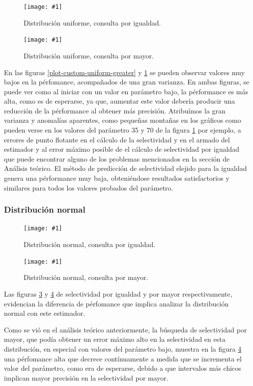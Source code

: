 \documentclass[a4paper, 10pt, twoside]{article}
\newcommand{\grafico}[3]{
  \begin{figure}[H]
    \texttt{[image: \#1]}
    \caption{#2}
    \label{#3}
  \end{figure}
}
\begin{document}
\grafico{plot-hist-uniform-equal}
        {Distribución uniforme, consulta por igualdad.}
        {plot-hist-uniform-equal}
\grafico{plot-hist-uniform-greater}
        {Distribución uniforme, consulta por mayor.}
        {plot-hist-uniform-greater}

En las figuras \ref{plot-custom-uniform-greater} y \ref{plot-hist-uniform-equal} se pueden observar valores muy bajos
en la pérfomance, acompañados de una gran varianza. En ambas figuras, se puede ver como al iniciar con un valor en parámetro bajo,
la pérformance es más alta, como es de esperarse, ya que, aumentar este valor debería producir una reducción de la pérformance al obtener más precisión.
Atribuímos la gran varianza y anomalías aparentes, como pequeñas montañas en los gráficos como pueden verse en los
valores del parámetro 35 y 70 de la figura \ref{plot-hist-uniform-equal} por ejemplo, a errores de punto flotante en el cálculo de la selectividad y en el armado del estimador y al error máximo posible de el cálculo de selectividad por igualdad que puede encontrar alguno de los problemas mencionados en la sección de Análisis teórico.
El método de predicción de selectividad elejido para la igualdad genera una pérformance muy baja, obteniéndose resultados satisfactorios y similares para todos los valores probados del parámetro.

\subsubsection{Distribución normal}


\grafico{plot-hist-normal-equal}
        {Distribución normal, consulta por igualdad.}
        {plot-hist-normal-equal}
\grafico{plot-hist-normal-greater}
        {Distribución normal, consulta por mayor.}
        {plot-hist-normal-greater}

Las figuras \ref{plot-hist-normal-equal} y \ref{plot-hist-normal-greater} de selectividad por igualdad y por mayor respectivamente, evidencian la diferencia 
de pérfomance que implica analizar la distribución normal con este estimador.

Como se vió en el análisis teórico anteriormente, la búsqueda de selectividad por mayor, que podía obtener un error máximo 
alto en la selectividad en esta distribución, en especial con valores del parámetro bajo, muestra en la figura \ref{plot-hist-normal-greater} una pérfomance alta 
que decrece contínuamente a medida que se incrementa el valor del parámetro, como era de esperarse, debido a que intervalos más chicos implican 
mayor precisión en la selectividad por mayor.
\end{document}
